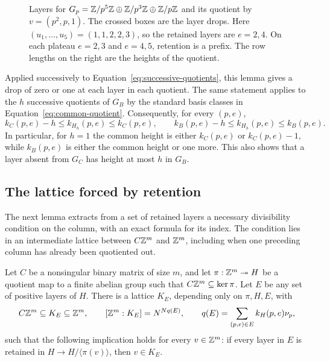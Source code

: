 \begin{figure}[H]
\centering

\caption{Layers for \(G_p=\mathbb Z/p^5\mathbb Z\oplus\mathbb Z/p^3\mathbb Z\oplus\mathbb Z/p\mathbb Z\)
and its quotient by \(v=(p^2,p,1)\). The crossed boxes are the layer
drops. Here \((u_1,\ldots,u_5)=(1,1,2,2,3)\), so the retained layers
are \(e=2,4\). On each plateau \(e=2,3\) and \(e=4,5\), retention is
a prefix. The row lengths on the right are the heights of the quotient.}
\label{fig:layers}
\end{figure}

Applied successively to Equation~\eqref{eq:successive-quotients}, this
lemma gives a drop of zero or one at each layer in each quotient. The
same statement applies to the \(h\) successive quotients of \(G_B\)
by the standard basis classes in Equation~\eqref{eq:common-quotient}.
Consequently, for every \((p,e)\),
\begin{equation}\label{eq:common-layer-interlacing}
 k_C(p,e)-h\le k_{H_h}(p,e)\le k_C(p,e),\qquad
 k_B(p,e)-h\le k_{H_h}(p,e)\le k_B(p,e).
\end{equation}
In particular, for \(h=1\) the common height is either \(k_C(p,e)\)
or \(k_C(p,e)-1\), while \(k_B(p,e)\) is either the common height or
one more. This also shows that a layer absent from \(G_C\) has height
at most \(h\) in \(G_B\).

\subsection{The lattice forced by retention}

The next lemma extracts from a set of retained layers a necessary
divisibility condition on the column, with an exact formula for its index.
The condition lies in an
intermediate lattice between \(C\mathbb Z^m\) and \(\mathbb Z^m\), including when
one preceding column has already been quotiented out.

\begin{lemma}\label{lem:retention-lattice}
Let \(C\) be a nonsingular binary matrix of size \(m\), and let
\(\pi:\mathbb Z^m\twoheadrightarrow H\) be a quotient map to a finite
abelian group such that \(C\mathbb Z^m\subseteq\ker\pi\). Let \(E\) be
any set of positive layers of \(H\). There is a lattice \(K_E\),
depending only on \(\pi,H,E\), with
\begin{equation}\label{eq:retention-lattice}
 C\mathbb Z^m\subseteq K_E\subseteq\mathbb Z^m,\qquad
 [\mathbb Z^m:K_E]=N^{Nq(E)},\qquad
 q(E)=\sum_{(p,e)\in E} k_H(p,e)\nu_p,
\end{equation}
such that the following implication holds for every \(v\in\mathbb Z^m\):
if every layer in \(E\) is retained in
\(H\longrightarrow H/\langle\pi(v)\rangle\), then \(v\in K_E\).
\end{lemma}

